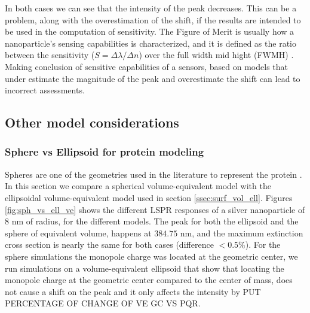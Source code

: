 In both cases we can see that the intensity of the peak decreases. This can be a problem, along with the overestimation of the shift,
if the results are intended to be used in the computation of sensitivity. The Figure of Merit is usually how a
nanoparticle's sensing capabilities is characterized, and it is defined as the ratio between the 
sensitivity ($S = \Delta \lambda / \Delta n$) over the full width mid hight (FWMH) \cite{otte2012}. Making 
conclusion of sensitive capabilities of a sensors, based on models that under estimate the magnitude of the peak and 
overestimate the shift can lead to incorrect assessments.

\subsection{Other model considerations}

\subsubsection{Sphere vs Ellipsoid for protein modeling}

Spheres are one of the geometries used in the literature to represent the protein \cite{SantiagoCordobaETal2011, UngerETal2009}. In this 
section we compare a spherical volume-equivalent model with the ellipsoidal volume-equivalent model used in section
\ref{ssec:surf_vol_ell}. Figures \ref{fig:sph_vs_ell_ve} shows the different LSPR responses of a silver nanoparticle of $8$ nm of radius, 
for the different models. The peak for both the ellipsoid and the sphere of equivalent volume, happens at $384.75$ nm, and the 
maximum extinction cross section is nearly the same for both cases (difference $<$0.5$\%$). For the sphere simulations 
the monopole charge was located at the geometric center, we run simulations on a volume-equivalent ellipsoid that show 
that locating the monopole charge at the geometric center compared to the center of mass, does not cause a shift on the peak 
and it only affects the intensity by {\color{red} PUT PERCENTAGE OF CHANGE OF VE GC VS PQR}.


